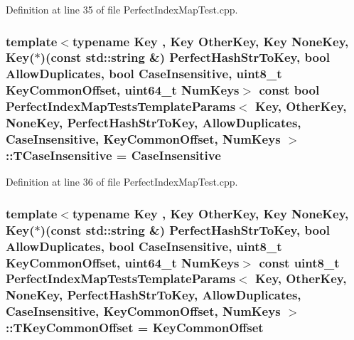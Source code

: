 Definition at line 35 of file Perfect\+Index\+Map\+Test.\+cpp.

\subsubsection[{T\+Case\+Insensitive}]{\setlength{\rightskip}{0pt plus 5cm}template$<$typename Key , Key Other\+Key, Key None\+Key, Key($\ast$)(const std\+::string \&) Perfect\+Hash\+Str\+To\+Key, bool Allow\+Duplicates, bool Case\+Insensitive, uint8\+\_\+t Key\+Common\+Offset, uint64\+\_\+t Num\+Keys$>$ const bool {\bf Perfect\+Index\+Map\+Tests\+Template\+Params}$<$ Key, Other\+Key, None\+Key, Perfect\+Hash\+Str\+To\+Key, Allow\+Duplicates, Case\+Insensitive, Key\+Common\+Offset, Num\+Keys $>$\+::T\+Case\+Insensitive = Case\+Insensitive\hspace{0.3cm}{\ttfamily [static]}}\label{structPerfectIndexMapTestsTemplateParams_ace7184579cb2a4c7e3aa3f5ded7772e9}


Definition at line 36 of file Perfect\+Index\+Map\+Test.\+cpp.

\subsubsection[{T\+Key\+Common\+Offset}]{\setlength{\rightskip}{0pt plus 5cm}template$<$typename Key , Key Other\+Key, Key None\+Key, Key($\ast$)(const std\+::string \&) Perfect\+Hash\+Str\+To\+Key, bool Allow\+Duplicates, bool Case\+Insensitive, uint8\+\_\+t Key\+Common\+Offset, uint64\+\_\+t Num\+Keys$>$ const uint8\+\_\+t {\bf Perfect\+Index\+Map\+Tests\+Template\+Params}$<$ Key, Other\+Key, None\+Key, Perfect\+Hash\+Str\+To\+Key, Allow\+Duplicates, Case\+Insensitive, Key\+Common\+Offset, Num\+Keys $>$\+::T\+Key\+Common\+Offset = Key\+Common\+Offset\hspace{0.3cm}{\ttfamily [static]}}\label{structPerfectIndexMapTestsTemplateParams_aff3b8033437e6997a2d4783289335ec3}



